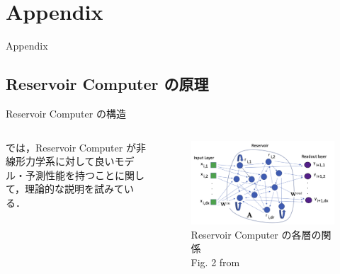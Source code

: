 \section{Appendix}

\begin{frame}
    \begin{center}
        \LARGE Appendix
    \end{center}
\end{frame}



\subsection{Reservoir Computer の原理}
\begin{frame}{Reservoir Computer の構造}
    \begin{columns}[T] %
  
        \begin{column}{.5\textwidth}
            \cite{Bollt}では，Reservoir Computer が非線形力学系に対して良いモデル・予測性能を持つことに関して，理論的な説明を試みている．
        \end{column}
        \begin{column}{.5\textwidth}
            \begin{figure}
                \includegraphics[width=\textwidth]{Fig/bollt_reservoir.png}
                \caption{\scriptsize{Reservoir Computer の各層の関係} \\ \tiny{Fig. 2 from \cite{Bollt}}}
            \end{figure}
        \end{column}
      \end{columns}
\end{frame}



